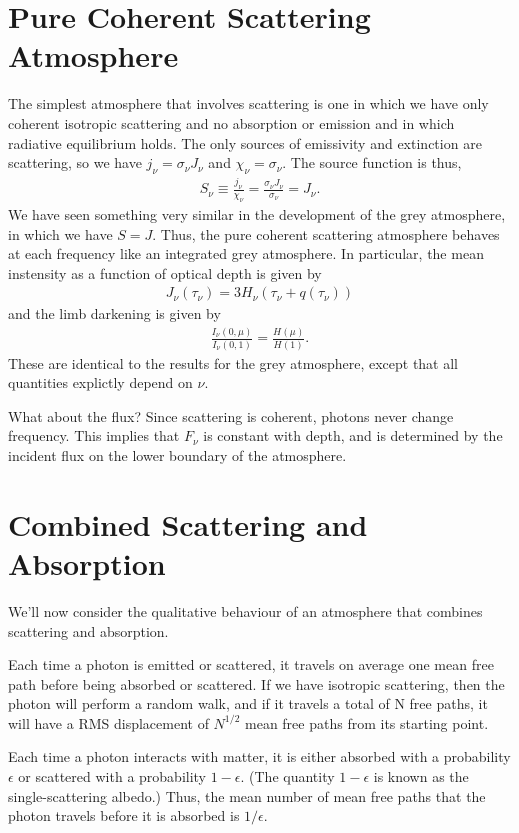\section{Pure Coherent Scattering Atmosphere}

The simplest atmosphere that involves scattering is one in
which we have only coherent isotropic scattering and no
absorption or emission and in which radiative equilibrium
holds. The only sources of emissivity and extinction are
scattering, so we have $j_\nu = \sigma_\nu J_\nu$ and
$\chi_\nu = \sigma_\nu$. The source function is thus,
\begin{align}
S_\nu \equiv \frac{j_\nu}{\chi_\nu} =
\frac{\sigma_\nu J_\nu}{\sigma_\nu} = J_\nu.
\end{align}
We have seen something very similar in the development of
the grey atmosphere, in which we have $S = J$. Thus, the
pure coherent scattering atmosphere behaves at each
frequency like an integrated grey atmosphere. In particular,
the mean instensity as a function of optical depth is given
by
\begin{align}
J_\nu(\tau_\nu) = 3H_\nu(\tau_\nu + q(\tau_\nu))
\end{align}
and the limb darkening is given by
\begin{align}
\frac{I_\nu(0,\mu)}{I_\nu(0,1)}
=
\frac{H(\mu)}{H(1)}.
\end{align}
These are identical to the results for the grey atmosphere,
except that all quantities explictly depend on $\nu$.

What about the flux? Since scattering is coherent, photons
never change frequency. This implies that $F_\nu$ is
constant with depth, and is determined by the incident flux
on the lower boundary of the atmosphere.

\section{Combined Scattering and Absorption}

We'll now consider the qualitative behaviour of an
atmosphere that combines scattering and absorption. 

Each time a photon is emitted or scattered, it travels on
average one mean free path before being absorbed or
scattered. If we have isotropic scattering, then the photon
will perform a random walk, and if it travels a total of N
free paths, it will have a RMS displacement of $N^{1/2}$
mean free paths from its starting point.

Each time a photon interacts with matter, it is either
absorbed with a probability $\epsilon$ or scattered with a
probability $1-\epsilon$. (The quantity $1-\epsilon$ is
known as the single-scattering albedo.) Thus, the mean
number of mean free paths that the photon travels before it
is absorbed is $1/\epsilon$.

